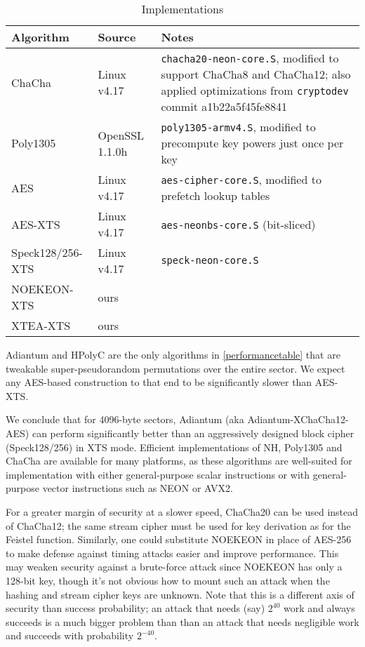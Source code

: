 \documentclass[eprint.tex]{subfiles}
\begin{document}
\begin{table}
    \caption{Implementations}
    \label{implementation}
    \centering
    \begin{tabular}{llp{7cm}}
        \toprule
        Algorithm & Source & Notes \\
    \midrule
    ChaCha & Linux v4.17 & \texttt{chacha20-neon-core.S}, modified to support
        ChaCha8 and ChaCha12; also applied optimizations from \texttt{cryptodev}
        commit a1b22a5f45fe8841 \\
    Poly1305 & OpenSSL 1.1.0h & \texttt{poly1305-armv4.S}, modified to
        precompute key powers just once per key \\
    \mbox{AES} & Linux v4.17 & \texttt{aes-cipher-core.S}, modified to prefetch
        lookup tables \\
    \mbox{AES-XTS} & Linux v4.17 & \texttt{aes-neonbs-core.S} (bit-sliced) \\
    \mbox{Speck128/256-XTS} & Linux v4.17 & \texttt{speck-neon-core.S} \\
    \mbox{NOEKEON-XTS} & ours & \\
    \mbox{XTEA-XTS} & ours & \\
    \bottomrule
    \end{tabular}
\end{table}

Adiantum and HPolyC are the only algorithms in \autoref{performancetable} that are tweakable
super-pseudorandom permutations over the entire sector.  We expect any AES-based
construction to that end to be significantly slower than \mbox{AES-XTS}.

We conclude that for 4096-byte sectors, Adiantum
(aka \mbox{Adiantum-XChaCha12-AES}) can perform
significantly better than an aggressively designed block cipher (\mbox{Speck128/256}) in XTS mode.
Efficient implementations of NH, Poly1305 and ChaCha are available for many
platforms, as these algorithms are well-suited for implementation with either
general-purpose scalar instructions or with general-purpose vector instructions
such as NEON or AVX2.

For a greater margin of security at a slower speed, ChaCha20 can
be used instead of ChaCha12; the same stream cipher
must be used for key derivation as for the Feistel function. Similarly, one could substitute
NOEKEON in place of AES-256 to make defense against timing attacks easier and improve performance.
This may weaken security against a brute-force attack since NOEKEON has only a 128-bit key, though
it's not obvious how to mount such an attack when the hashing and stream cipher keys are unknown.
Note that this is a different axis of security than success probability; an
attack that needs (say) $2^{40}$ work and always succeeds is a much bigger
problem than than an attack that needs negligible work and succeeds with
probability $2^{-40}$.

\subbib
\end{document}
